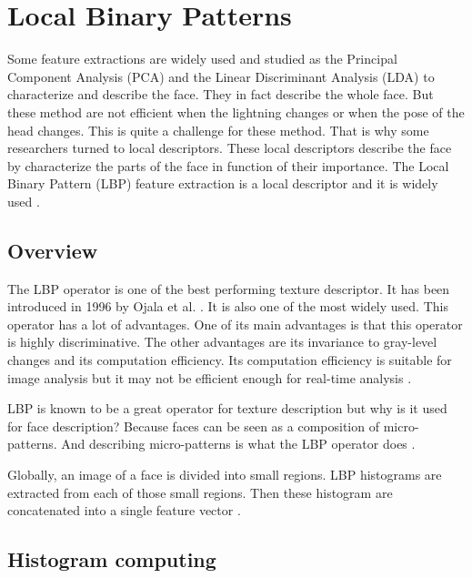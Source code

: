 \chapter{Local Binary Patterns}
\label{chap:lbp}

\noindent Some feature extractions are widely used and studied as the Principal Component Analysis (PCA) and the Linear Discriminant Analysis (LDA) to characterize and describe the face. They in fact describe the whole face. But these method are not efficient when the lightning changes or when the pose of the head changes. This is quite a challenge for these method. That is why some researchers turned to local descriptors. These local descriptors describe the face by characterize the parts of the face in function of their importance. The Local Binary Pattern (LBP) feature extraction is a local descriptor and it is widely used \cite{AHO06}.
\newline

\section{Overview}

\vspace{\baselineskip}
\noindent The LBP operator is one of the best performing texture descriptor. It has been introduced in 1996 by Ojala et al. \cite{OJA96}. It is also one of the most widely used. This operator has a lot of advantages. One of its main advantages is that this operator is highly discriminative. The other advantages are its invariance to gray-level changes and its computation efficiency. Its computation efficiency is suitable for image analysis but it may not be efficient enough for real-time analysis \cite{AHO06}.
\newline

\noindent LBP is known to be a great operator for texture description but why is it used for face description? Because faces can be seen as a composition of micro-patterns. And describing micro-patterns is what the LBP operator does \cite{AHO06}.
\newline

\noindent Globally, an image of a face is divided into small regions. LBP histograms are extracted from each of those small regions. Then these histogram are concatenated into a single feature vector \cite{JUL07}.
\newline

\section{Histogram computing}

